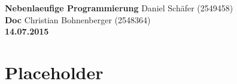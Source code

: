 \documentclass[12pt]{article}
\begin{document}

\noindent
{\Large \textbf{Nebenlaeufige Programmierung}} \hfill Daniel Schäfer (2549458) \\
{\Large \textbf{Doc}} \hfill Christian Bohnenberger (2548364)
\\
{\textbf{14.07.2015}}
\\

\section{Placeholder}
\end{document}
